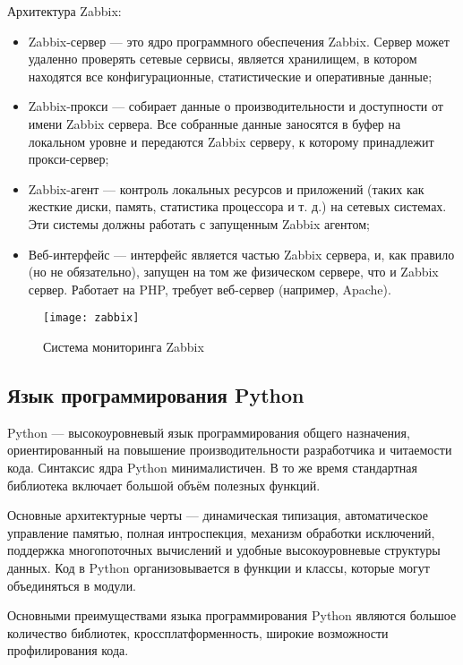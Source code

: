 Архитектура Zabbix:
\begin{itemize}
\item Zabbix-сервер — это ядро программного обеспечения Zabbix. Сервер может удаленно проверять сетевые сервисы, является хранилищем, в котором находятся все конфигурационные, статистические и оперативные данные;
\item Zabbix-прокси — собирает данные о производительности и доступности от имени Zabbix сервера. Все собранные данные заносятся в буфер на локальном уровне и передаются Zabbix серверу, к которому принадлежит прокси-сервер;
\item Zabbix-агент — контроль локальных ресурсов и приложений (таких как жесткие диски, память, статистика процессора и т. д.) на сетевых системах. Эти системы должны работать с запущенным Zabbix агентом;
\item Веб-интерфейс — интерфейс является частью Zabbix сервера, и, как правило (но не обязательно), запущен на том же физическом сервере, что и Zabbix сервер. Работает на PHP, требует веб-сервер (например, Apache).
\end{itemize}

\begin{figure}[h!]
    \centering
    \texttt{[image: zabbix]}
    \caption{Система мониторинга Zabbix}
    \label{img:0}
\end{figure} 

\subsection{Язык программирования Python}

Python --- высокоуровневый язык программирования общего назначения, ориентированный на повышение производительности разработчика и читаемости кода. Синтаксис ядра Python минималистичен. В то же время стандартная библиотека включает большой объём полезных функций. \par

Основные архитектурные черты — динамическая типизация, автоматическое управление памятью, полная интроспекция, механизм обработки исключений, поддержка многопоточных вычислений и удобные высокоуровневые структуры данных. Код в Python организовывается в функции и классы, которые могут объединяться в модули.\par

Основными преимуществами языка программирования Python являются большое количество библиотек, кроссплатформенность, широкие возможности профилирования кода. \par

